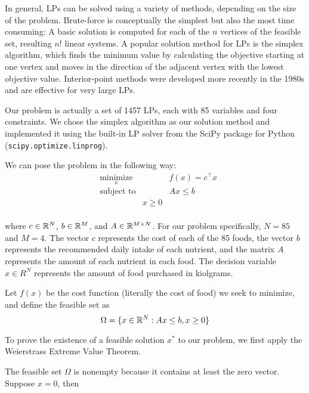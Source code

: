 In general, LPs can be solved using a variety of methods, depending on the size
of the problem. Brute-force is conceptually the simplest but also the most time
consuming: A basic solution is computed for each of the $n$ vertices of the
feasible set, resulting $n!$ linear systems.\cite{chongzak} A popular solution
method for LPs is the simplex algorithm, which finds the minimum value by
calculating the objective starting at one vertex and moves in the direction of
the adjacent vertex with the lowest objective value. Interior-point methods were
developed more recently in the 1980s and are effective for very large
LPs.\cite{chongzak} 

Our problem is actually a set of 1457 LPs, each with 85 variables and four
constraints. We chose the simplex algorithm as our solution method and
implemented it using the built-in LP solver from the SciPy package for Python
(\texttt{scipy.optimize.linprog}).\cite{SciPy}


We can pose the problem in the following way:
\begin{equation*}
\begin{aligned}
& \underset{x}{\text{minimize}}
    & & f(x) = c^\top x \\
& \text{subject to}
& & A x \leq b \\
& & x \geq 0 \\
\end{aligned}
\end{equation*}

where $c \in \mathbb{R}^N$, $b \in \mathbb{R}^M$, and $A \in \mathbb{R}^{M \times N}$. For our problem
specifically, $N = 85$ and $M = 4$. The vector $c$ represents the cost of each
of the 85 foods, the vector $b$ represents the recommended daily intake of each
nutrient, and the matrix $A$ represents the amount of each nutrient in each
food. The decision variable $x \in R^N$ represents the amount of food purchased
in kiolgrams.

Let $f(x)$ be the cost function (literally the cost of food) we seek to
minimize, and define the feasible set as 
\begin{equation*}
    \Omega = \{x \in \mathbb{R}^N: Ax \leq b, x \geq 0 \}
\end{equation*}

To prove the existence of a feasible solution $x^*$ to our problem, we first
apply the Weierstrass Extreme Value Theorem. \cite{chongzak}

The feasible set $\Omega$ is nonempty because it contains at least the zero
vector. Suppose $x=0$, then

